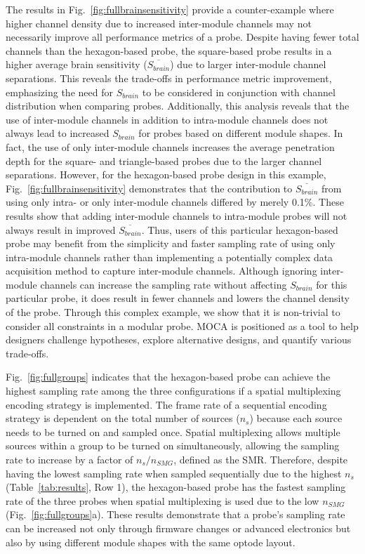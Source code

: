 The results in Fig.~\ref{fig:fullbrainsensitivity} provide a counter-example where higher channel density due to increased inter-module channels may not necessarily improve all performance metrics of a probe. Despite having fewer total channels than the hexagon-based probe, the square-based probe results in a higher average brain sensitivity ($\overline{S_{brain}}$) due to larger inter-module channel separations. This reveals the trade-offs in performance metric improvement, emphasizing the need for $S_{brain}$ to be considered in conjunction with channel distribution when comparing probes. Additionally, this analysis reveals that the use of inter-module channels in addition to intra-module channels does not always lead to increased $S_{brain}$ for probes based on different module shapes. In fact, the use of only inter-module channels increases the average penetration depth for the square- and triangle-based probes due to the larger channel separations. However, for the hexagon-based probe design in this example, Fig.~\ref{fig:fullbrainsensitivity} demonstrates that the contribution to $\overline{S_{brain}}$ from using only intra- or only inter-module channels differed by merely 0.1\%. These results show that adding inter-module channels to intra-module probes will not always result in improved $\overline{S_{brain}}$. Thus, users of this particular hexagon-based probe may benefit from the simplicity and faster sampling rate of using only intra-module channels rather than implementing a potentially complex data acquisition method to capture inter-module channels. Although ignoring inter-module channels can increase the sampling rate without affecting $S_{brain}$ for this particular probe, it does result in fewer channels and lowers the channel density of the probe. Through this complex example, we show that it is non-trivial to consider all constraints in a modular probe. \ac{MOCA} is positioned as a tool to help designers challenge hypotheses, explore alternative designs, and quantify various trade-offs.

Fig.~\ref{fig:fullgroups} indicates that the hexagon-based probe can achieve the highest sampling rate among the three configurations if a spatial multiplexing encoding strategy is implemented. The frame rate of a sequential encoding strategy is dependent on the total number of sources ($n_s$) because each source needs to be turned on and sampled once. Spatial multiplexing allows multiple sources within a group to be turned on simultaneously, allowing the sampling rate to increase by a factor of $n_s/n_{SMG}$, defined as the \ac{SMR}. Therefore, despite having the lowest sampling rate when sampled sequentially due to the highest $n_s$ (Table~\ref{tab:results}, Row 1), the hexagon-based probe has the fastest sampling rate of the three probes when spatial multiplexing is used due to the low $n_{SMG}$ (Fig.~\ref{fig:fullgroups}a). These results demonstrate that a probe's sampling rate can be increased not only through firmware changes or advanced electronics but also by using different module shapes with the same optode layout.

